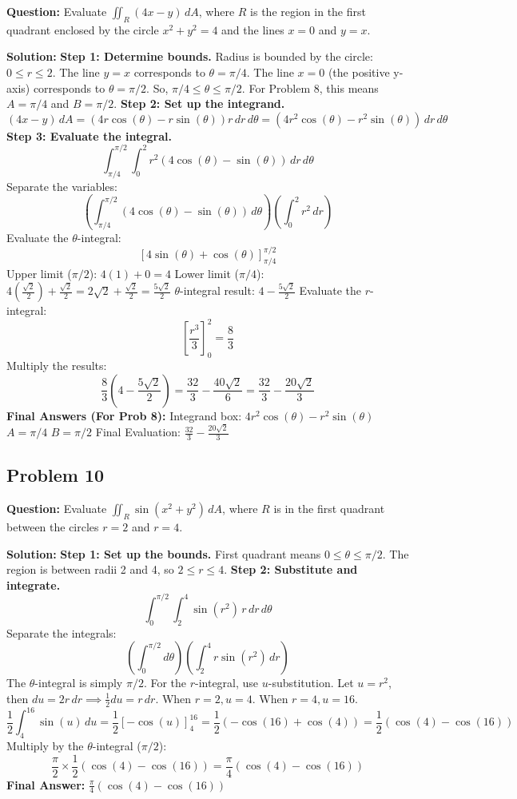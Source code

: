 \documentclass[12pt]{article}
\begin{document}
\textbf{Question:} Evaluate $\iint_R (4x - y) \, dA$, where $R$ is the region in the first quadrant enclosed by the circle $x^2 + y^2 = 4$ and the lines $x = 0$ and $y = x$.

\textbf{Solution:}
\textbf{Step 1: Determine bounds.}
Radius is bounded by the circle: $0 \le r \le 2$.
The line $y = x$ corresponds to $\theta = \pi/4$.
The line $x = 0$ (the positive y-axis) corresponds to $\theta = \pi/2$.
So, $\pi/4 \le \theta \le \pi/2$. 
For Problem 8, this means $A = \pi/4$ and $B = \pi/2$.
\textbf{Step 2: Set up the integrand.}
\[ (4x - y) \, dA = (4r\cos(\theta) - r\sin(\theta)) r \, dr \, d\theta = (4r^2\cos(\theta) - r^2\sin(\theta)) \, dr \, d\theta \]
\textbf{Step 3: Evaluate the integral.}
\[ \int_{\pi/4}^{\pi/2} \int_0^2 r^2(4\cos(\theta) - \sin(\theta)) \, dr \, d\theta \]
Separate the variables:
\[ \left( \int_{\pi/4}^{\pi/2} (4\cos(\theta) - \sin(\theta)) \, d\theta \right) \left( \int_0^2 r^2 \, dr \right) \]
Evaluate the $\theta$-integral:
\[ \left[ 4\sin(\theta) + \cos(\theta) \right]_{\pi/4}^{\pi/2} \]
Upper limit ($\pi/2$): $4(1) + 0 = 4$
Lower limit ($\pi/4$): $4\left(\frac{\sqrt{2}}{2}\right) + \frac{\sqrt{2}}{2} = 2\sqrt{2} + \frac{\sqrt{2}}{2} = \frac{5\sqrt{2}}{2}$
$\theta$-integral result: $4 - \frac{5\sqrt{2}}{2}$
Evaluate the $r$-integral:
\[ \left[ \frac{r^3}{3} \right]_0^2 = \frac{8}{3} \]
Multiply the results:
\[ \frac{8}{3} \left( 4 - \frac{5\sqrt{2}}{2} \right) = \frac{32}{3} - \frac{40\sqrt{2}}{6} = \frac{32}{3} - \frac{20\sqrt{2}}{3} \]
\textbf{Final Answers (For Prob 8):}
Integrand box: $4r^2\cos(\theta) - r^2\sin(\theta)$
$A = \pi/4$
$B = \pi/2$
Final Evaluation: $\frac{32}{3} - \frac{20\sqrt{2}}{3}$

\subsection*{Problem 10}
\textbf{Question:} Evaluate $\iint_R \sin(x^2 + y^2) \, dA$, where $R$ is in the first quadrant between the circles $r=2$ and $r=4$.

\textbf{Solution:}
\textbf{Step 1: Set up the bounds.}
First quadrant means $0 \le \theta \le \pi/2$.
The region is between radii 2 and 4, so $2 \le r \le 4$.
\textbf{Step 2: Substitute and integrate.}
\[ \int_0^{\pi/2} \int_2^4 \sin(r^2) \, r \, dr \, d\theta \]
Separate the integrals:
\[ \left( \int_0^{\pi/2} d\theta \right) \left( \int_2^4 r\sin(r^2) \, dr \right) \]
The $\theta$-integral is simply $\pi/2$.
For the $r$-integral, use $u$-substitution. Let $u = r^2$, then $du = 2r \, dr \implies \frac{1}{2}du = r \, dr$.
When $r=2, u=4$. When $r=4, u=16$.
\[ \frac{1}{2} \int_4^{16} \sin(u) \, du = \frac{1}{2} \left[ -\cos(u) \right]_4^{16} = \frac{1}{2} (-\cos(16) + \cos(4)) = \frac{1}{2} (\cos(4) - \cos(16)) \]
Multiply by the $\theta$-integral ($\pi/2$):
\[ \frac{\pi}{2} \times \frac{1}{2} (\cos(4) - \cos(16)) = \frac{\pi}{4}(\cos(4) - \cos(16)) \]
\textbf{Final Answer:} $\frac{\pi}{4}(\cos(4) - \cos(16))$
\end{document}
